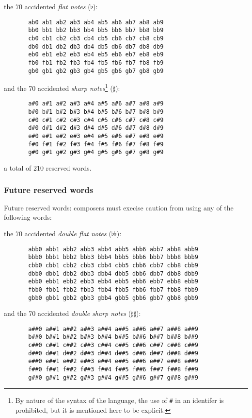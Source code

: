 the 70 accidented \textit{flat notes} ($\flat$):

\begin{verbatim}
       ab0 ab1 ab2 ab3 ab4 ab5 ab6 ab7 ab8 ab9
       bb0 bb1 bb2 bb3 bb4 bb5 bb6 bb7 bb8 bb9
       cb0 cb1 cb2 cb3 cb4 cb5 cb6 cb7 cb8 cb9
       db0 db1 db2 db3 db4 db5 db6 db7 db8 db9
       eb0 eb1 eb2 eb3 eb4 eb5 eb6 eb7 eb8 eb9
       fb0 fb1 fb2 fb3 fb4 fb5 fb6 fb7 fb8 fb9
       gb0 gb1 gb2 gb3 gb4 gb5 gb6 gb7 gb8 gb9
\end{verbatim}

and the 70 accidented \textit{sharp notes}\footnote{By nature of the syntax of
the language, the use of \protect\texttt{\#} in an identifer is prohibited,
but it is mentioned here to be explicit.} ($\sharp$):
\begin{verbatim}
       a#0 a#1 a#2 a#3 a#4 a#5 a#6 a#7 a#8 a#9
       b#0 b#1 b#2 b#3 b#4 b#5 b#6 b#7 b#8 b#9
       c#0 c#1 c#2 c#3 c#4 c#5 c#6 c#7 c#8 c#9
       d#0 d#1 d#2 d#3 d#4 d#5 d#6 d#7 d#8 d#9
       e#0 e#1 e#2 e#3 e#4 e#5 e#6 e#7 e#8 e#9
       f#0 f#1 f#2 f#3 f#4 f#5 f#6 f#7 f#8 f#9
       g#0 g#1 g#2 g#3 g#4 g#5 g#6 g#7 g#8 g#9
\end{verbatim}

a total of 210 reserved words.


\subsubsection{Future reserved words}

\np Future reserved words: composers must execise caution from using any
of the following words:

the 70 accidented \textit{double flat notes} ($\flat\flat$):

\begin{verbatim}
       abb0 abb1 abb2 abb3 abb4 abb5 abb6 abb7 abb8 abb9
       bbb0 bbb1 bbb2 bbb3 bbb4 bbb5 bbb6 bbb7 bbb8 bbb9
       cbb0 cbb1 cbb2 cbb3 cbb4 cbb5 cbb6 cbb7 cbb8 cbb9
       dbb0 dbb1 dbb2 dbb3 dbb4 dbb5 dbb6 dbb7 dbb8 dbb9
       ebb0 ebb1 ebb2 ebb3 ebb4 ebb5 ebb6 ebb7 ebb8 ebb9
       fbb0 fbb1 fbb2 fbb3 fbb4 fbb5 fbb6 fbb7 fbb8 fbb9
       gbb0 gbb1 gbb2 gbb3 gbb4 gbb5 gbb6 gbb7 gbb8 gbb9
\end{verbatim}

and the 70 accidented \textit{double sharp notes} ($\sharp\sharp$):

\begin{verbatim}
       a##0 a##1 a##2 a##3 a##4 a##5 a##6 a##7 a##8 a##9
       b##0 b##1 b##2 b##3 b##4 b##5 b##6 b##7 b##8 b##9
       c##0 c##1 c##2 c##3 c##4 c##5 c##6 c##7 c##8 c##9
       d##0 d##1 d##2 d##3 d##4 d##5 d##6 d##7 d##8 d##9
       e##0 e##1 e##2 e##3 e##4 e##5 e##6 e##7 e##8 e##9
       f##0 f##1 f##2 f##3 f##4 f##5 f##6 f##7 f##8 f##9
       g##0 g##1 g##2 g##3 g##4 g##5 g##6 g##7 g##8 g##9
\end{verbatim}

